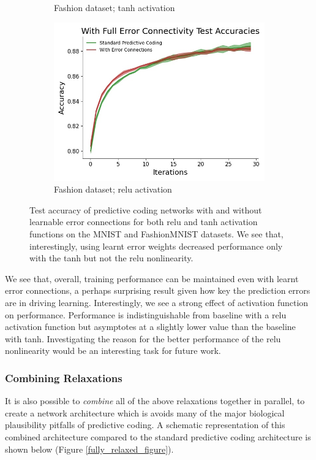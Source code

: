 \begin{figure}[ht]
\begin{subfigure}[b]{0.5\linewidth}
    \caption{\small Fashion dataset; tanh activation} 
  \end{subfigure}%
  \begin{subfigure}[b]{0.5\linewidth}
    \centering
    \includegraphics[width=0.75\linewidth]{chapter_3_figures/fashion_relu_With_Full_Error_Connectivity_Test_Accuracies_prelim_2.jpg} 
    \caption{\small Fashion dataset; relu activation} 
  \end{subfigure} 
  \caption{Test accuracy of predictive coding networks with and without learnable error connections for both relu and tanh activation functions on the MNIST and FashionMNIST datasets. We see that, interestingly, using learnt error weights decreased performance only with the tanh but not the relu nonlinearity.}
  
\label{learning_error_weights}
\end{figure} 
We see that, overall, training performance can be maintained even with learnt error connections, a perhaps surprising result given how key the prediction errors are in driving learning. Interestingly, we see a strong effect of activation function on performance. Performance is indistinguishable from baseline with a relu activation function but asymptotes at a slightly lower value than the baseline with tanh. Investigating the reason for the better performance of the relu nonlinearity would be an interesting task for future work.

\subsubsection{Combining Relaxations}

It is also possible to \emph{combine} all of the above relaxations together in parallel, to create a network architecture which is avoids many of the major biological plausibility pitfalls of predictive coding. A schematic representation of this combined architecture compared to the standard predictive coding architecture is shown below (Figure \ref{fully_relaxed_figure}).

